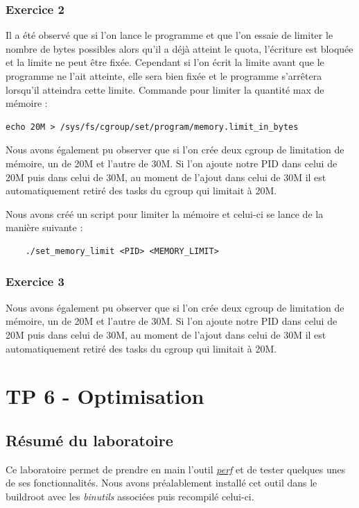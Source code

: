 \documentclass{ReportTemplate}
\begin{document}
\subsection{Exercice 2}
Il a été observé que si l'on lance le programme et que l'on essaie de limiter le
nombre de bytes possibles alors qu'il a déjà atteint le quota, l'écriture est
bloquée et la limite ne peut être fixée. Cependant si l'on écrit la limite avant
que le programme ne l'ait atteinte, elle sera bien fixée et le programme
s'arrêtera lorsqu'il atteindra cette limite.\newline
Commande pour limiter la quantité max de mémoire :
\begin{verbatim}
echo 20M > /sys/fs/cgroup/set/program/memory.limit_in_bytes
\end{verbatim}

Nous avons également pu observer que si l'on crée deux cgroup de limitation de
mémoire, un de 20M et l'autre de 30M. Si l'on ajoute notre PID dans celui de 20M
puis dans celui de 30M, au moment de l'ajout dans celui de 30M il est
automatiquement retiré des tasks du cgroup qui limitait à 20M.\newline

Nous avons créé un script pour limiter la mémoire et celui-ci se lance de la
manière suivante : 
\begin{verbatim}
    ./set_memory_limit <PID> <MEMORY_LIMIT>
\end{verbatim}
\subsection{Exercice 3}
Nous avons également pu observer que si l'on crée deux cgroup de limitation de
mémoire, un de 20M et l'autre de 30M. Si l'on ajoute notre PID dans celui de 20M
puis dans celui de 30M, au moment de l'ajout dans celui de 30M il est
automatiquement retiré des tasks du cgroup qui limitait à 20M.

\chapter{TP 6 - Optimisation}
\section{Résumé du laboratoire}
Ce laboratoire permet de prendre en main l'outil \href{https://man7.org/linux/man-pages/man1/perf.1.html}{\textit{perf}} et de tester
quelques unes de ses fonctionnalités. Nous avons préalablement installé cet
outil dans le buildroot avec les \textit{binutils} associées puis recompilé
celui-ci.
\end{document}
